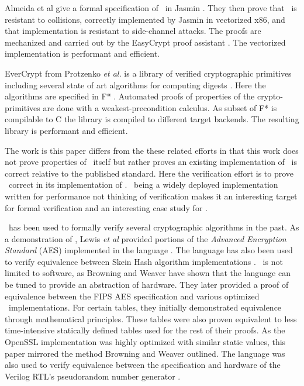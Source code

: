 Almeida et al give a formal specification of \shaThree\ in Jasmin \cite{10.1145/3319535.3363211}.
They then prove that \shaThree\ is resistant to collisions, correctly implemented by Jasmin in vectorized x86, and that implementation is resistant to side-channel attacks.
The proofs are mechanized and carried out by the EasyCrypt proof assistant \cite{easycrypt}.
The vectorized implementation is performant and efficient.

EverCrypt from Protzenko \emph{et al.} is a library of verified cryptographic primitives including several state of art algorithms for computing digests \cite{9152808}.
Here the algorithms are specified in F* \cite{fstar}.
Automated proofs of properties of the crypto-primitives are done with a weakest-precondition calculus.
As subset of F* is compilable to C the library is compiled to different target backends.
The resulting library is performant and efficient.

The work is this paper differs from the these related efforts in that this work does not prove properties of \shaThree\ itself but rather proves an existing implementation of \shaThree\ is correct relative to the published standard.
Here the verification effort is to prove \openssl\ correct in its implementation of \shaThree.
\openssl\ being a widely deployed implementation written for performance not thinking of verification makes it an interesting target for formal verification and an interesting case study for \saw.

\cryptol\ has been used to formally verify several cryptographic algorithms in the past.
As a demonstration of \cryptol, Lewis \emph{et al} provided portions of the \emph{Advanced Encryption Standard} (AES) implemented in the language \cite{crypt-hi}.
The language has also been used to verify equivalence between Skein Hash algorithm implementations \cite{hard-soft}.
\cryptol\ is not limited to software, as Browning and Weaver \cite{design-verif} have shown that the language can be tuned to provide an abstraction of hardware.
They later provided a proof of equivalence between the FIPS AES specification and various optimized \cryptol\ implementations.
For certain tables, they initially demonstrated equivalence through mathematical principles.
These tables were also proven equivalent to less time-intensive statically defined tables used for the rest of their proofs.
As the OpenSSL implementation was highly optimized with similar static values, this paper mirrored the method Browning and Weaver outlined.
The language was also used to verify equivalence between the specification and hardware of the Verilog RTL's pseudorandom number generator \cite{pseudorandom}.

